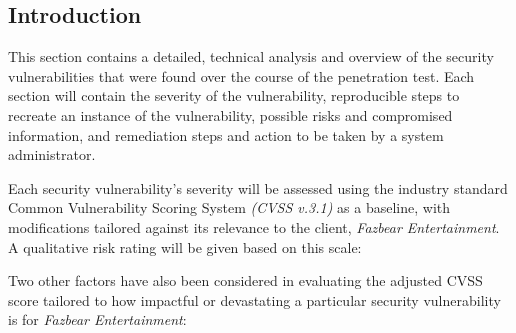\documentclass[12pt, letterpaper]{article}
\begin{document}
\subsection{Introduction}

This section contains a detailed, technical analysis and overview of
the security vulnerabilities that were found over the course of the
penetration test. Each section will contain the severity of the
vulnerability, reproducible steps to recreate an instance of the
vulnerability, possible risks and compromised information, and
remediation steps and action to be taken by a system administrator. \bigskip

Each security vulnerability's severity will be assessed using the
industry standard Common Vulnerability Scoring System \textit{(CVSS
v.3.1)} as a baseline, with modifications tailored against its
relevance to the client, \textit{Fazbear Entertainment}. A
qualitative risk rating will be given based on this scale:

\bigskip
\begin{table}[!ht]
  \centering
  \caption{Qualitative risk rating scale.}
  \label{cvss}
\end{table}
\FloatBarrier
\bigskip

Two other factors have also been considered in evaluating the adjusted CVSS
score tailored to how impactful or devastating a particular security
vulnerability is for \textit{Fazbear Entertainment}:
\end{document}
